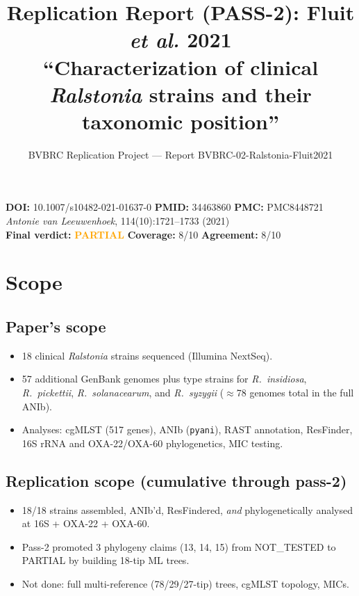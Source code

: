 \documentclass[11pt]{article}
\title{Replication Report (PASS-2): Fluit \emph{et al.} 2021 \\
\large ``Characterization of clinical \emph{Ralstonia} strains and their taxonomic position''}
\author{BVBRC Replication Project --- Report BVBRC-02-Ralstonia-Fluit2021}
\date{}
\begin{document}
\maketitle

\begin{center}
\textbf{DOI:} 10.1007/s10482-021-01637-0 \quad
\textbf{PMID:} 34463860 \quad
\textbf{PMC:} PMC8448721 \\
\emph{Antonie van Leeuwenhoek}, 114(10):1721--1733 (2021) \\[0.5em]
\textbf{Final verdict:} \textcolor{orange}{\textbf{PARTIAL}} \quad
\textbf{Coverage:} 8/10 \quad \textbf{Agreement:} 8/10
\end{center}

\section{Scope}

\subsection{Paper's scope}
\begin{itemize}[nosep]
  \item 18 clinical \emph{Ralstonia} strains sequenced (Illumina NextSeq).
  \item 57 additional GenBank genomes plus type strains for
        \emph{R.\ insidiosa}, \emph{R.\ pickettii},
        \emph{R.\ solanacearum}, and \emph{R.\ syzygii} ($\approx$78 genomes total in the full ANIb).
  \item Analyses: cgMLST (517 genes), ANIb (\texttt{pyani}), RAST annotation,
        ResFinder, 16S rRNA and OXA-22/OXA-60 phylogenetics, MIC testing.
\end{itemize}

\subsection{Replication scope (cumulative through pass-2)}
\begin{itemize}[nosep]
  \item 18/18 strains assembled, ANIb'd, ResFindered, \emph{and} phylogenetically analysed at 16S + OXA-22 + OXA-60.
  \item Pass-2 promoted 3 phylogeny claims (13, 14, 15) from NOT\_TESTED to PARTIAL by building 18-tip ML trees.
  \item Not done: full multi-reference (78/29/27-tip) trees, cgMLST topology, MICs.
\end{itemize}
\end{document}
